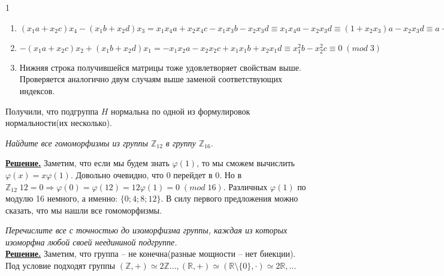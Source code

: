 \documentclass[14pt,a4paper]{scrartcl}
\begin{document}
\begin{spacing}{1}
\begin{enumerate}
		\item $(x_1a+x_2c)x_4 - (x_1b+x_2d)x_3 = x_1x_4a + x_2x_4c - x_1x_3b-x_2x_3d \equiv x_1x_4a-x_2x_3d \equiv (1 + x_2x_3)a - x_2x_3d \equiv a + x_2x_3(a - d) \equiv a \equiv 1\;(mod\;3)$
		\item $-(x_1a+x_2c)x_2 + (x_1b+x_2d)x_1 = -x_1x_2a - x_2x_2c + x_1x_1b+x_2x_1d \equiv x_1^2b - x_2^2c \equiv 0\;(mod\;3)$
		\item Нижняя строка получившейся матрицы тоже удовлетворяет свойствам выше. Проверяется аналогично двум случаям выше заменой соответствующих индексов.
	\end{enumerate}
	Получили, что подгруппа $H$ нормальна по одной из формулировок нормальности(их несколько).
	
	
	\begin{center}
	\end{center}
	\textit{Найдите все гомоморфизмы из группы $\mathbb{Z}_{12}$ в группу $\mathbb{Z}_{16}$.}
	
	\noindent \textbf{\underline{Решение.}} Заметим, что если мы будем знать $\varphi(1)$, то мы сможем вычислить $\varphi(x) = x\varphi(1)$. Довольно очевидно, что 0 перейдет в 0. Но в $\mathbb{Z}_{12}\;12 = 0 \Rightarrow \varphi(0) = \varphi(12) = 12\varphi(1) = 0\;(mod\;16)$. Различных $\varphi(1)$ по модулю 16 немного, а именно: $\{0; 4; 8; 12\}$. В силу первого предложения можно сказать, что мы нашли все гомоморфизмы.
	
	\begin{center}
	\end{center}
	\textit{Перечислите все с точностью до изоморфизма группы, каждая из которых изоморфна любой своей неедининой подгруппе.}\\
	\noindent \textbf{\underline{Решение.}} Заметим, что группа -- не конечна(разные мощности -- нет биекции). Под условие подходят группы $(\mathbb{Z}, +)\simeq 2\mathbb{Z} ..., (\mathbb{R},+)\simeq(\mathbb{R}\setminus\{0\}, \cdot)\simeq2\mathbb{R},...$
\end{spacing}
\end{document}
